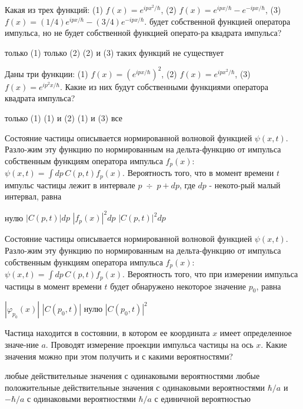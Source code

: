 \documentclass[11pt,a4paper]{exam}
\begin{document}
\begin{questions}
\question Какая из трех функций: 
(1) $f(x) = {e^{ip{x^2}/\hbar }}$, (2) $f(x) = {e^{ipx/\hbar }} - {e^{ - ipx/\hbar }}$, (3) $f(x) = (1/4){e^{ipx/\hbar }} - (3/4){e^{ - ipx/\hbar }}$. 
будет собственной функцией оператора импульса, но не будет собственной функцией операто-ра квадрата импульса?
\begin{choices}
\choice только (1)      
\choice только (2)      
\choice (2) и (3)       
\choice таких функций не существует
\end{choices}

\question Даны три функции: 
(1) $f(x) = {\left( {{e^{ipx/\hbar }}} \right)^2}$, (2) $f(x) = {e^{ip{x^2}/\hbar }}$, (3) $f(x) = {e^{i{p^2}x/\hbar }}$. 
Какие из них будут собственными функциями оператора квадрата импульса?
\begin{choices}
\choice только (1)      
\choice (1) и (2)    
\choice (1) и (3)    
\choice все
\end{choices}

\question Состояние частицы описывается нормированной волновой функцией $\psi (x,t)$. Разло-жим эту функцию по нормированным на дельта-функцию от импульса собственным функциям оператора импульса ${f_p}(x)$: $\psi (x,t) = \int {dp} \,C(p,t){f_p}(x)$. Вероятность того, что в момент времени $t$ импульс частицы лежит в интервале $p\; \div \;p + dp$, где $dp$ - некото-рый малый интервал, равна
\begin{choices}
\choice нулю      
\choice $\left| {C(p,t)} \right|dp$    
\choice ${\left| {{f_p}(x)} \right|^2}dp$    
\choice ${\left| {C(p,t)} \right|^2}dp$
\end{choices}

\question Состояние частицы описывается нормированной волновой функцией $\psi (x,t)$. Разло-жим эту функцию по нормированным на дельта-функцию от импульса собственным функциям оператора импульса ${f_p}(x)$: $\psi (x,t) = \int {dp} \,C(p,t){f_p}(x)$. Вероятность того, что при измерении импульса частицы в момент времени $t$ будет обнаружено некоторое значение ${p_0}$, равна
\begin{choices}
\choice $\left| {{\varphi _{{p_0}}}(x)} \right|$      
\choice $\left| {C({p_0},t)} \right|$     
\choice нулю      
\choice ${\left| {C({p_0},t)} \right|^2}$
\end{choices}

\question Частица находится в состоянии, в котором ее координата $x$ имеет определенное значе-ние $a$. Проводят измерение проекции импульса частицы на ось $x$. Какие значения можно при этом получить и с какими вероятностями?
\begin{choices}
\choice любые действительные значения с одинаковыми вероятностями
\choice любые положительные действительные значения с одинаковыми вероятностями
\choice $\hbar /a$ и $ - \hbar /a$ с одинаковыми вероятностями
\choice $\hbar /a$ с единичной вероятностью
\end{choices}


\end{questions}
\end{document}
